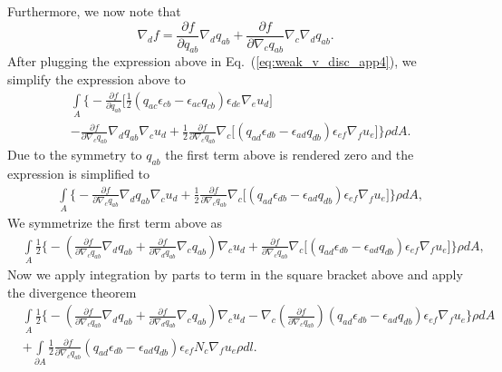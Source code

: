 Furthermore, we now note that 
\begin{equation}
	\nabla_d f = \frac{\partial f}{\partial q_{ab}}\nabla_d q_{ab} + \frac{\partial f}{\partial \nabla_c q_{ab}} \nabla_c \nabla_d q_{ab}.
\end{equation}
After plugging the expression above in Eq.~(\ref{eq:weak_v_disc_app4}), we simplify the expression above to 
\begin{equation}
	\label{eq:weak_v_disc_app5}
	\begin{aligned}
		&\underset{ A}{\int} \bigg \{   - \frac{\partial f}{\partial q_{ab}}  \bigg[\frac{1}{2}\left(q_{ac} \epsilon_{cb}-\epsilon_{ac}q_{cb}\right) \epsilon_{de}\nabla_e u_d\bigg] \\
		&-  \frac{\partial f}{\partial \nabla_c q_{ab}} \nabla_d q_{ab} \nabla_c u_d + \frac{1}{2} \frac{\partial f}{\partial \nabla_c q_{ab}} \nabla_c\bigg[\left(q_{ad} \epsilon_{db}-\epsilon_{ad}q_{db}\right) \epsilon_{ef}\nabla_f u_e\bigg] \bigg \} \rho dA .
	\end{aligned}
\end{equation}
Due to the symmetry to $q_{ab}$ the first term above is rendered zero and the expression is simplified to
\begin{equation}
	\label{eq:weak_v_disc_app6}
	\begin{aligned}
		&\underset{ A}{\int} \bigg \{ -\frac{\partial f}{\partial \nabla_c q_{ab}}  \nabla_d q_{ab} \nabla_c u_d +\frac{1}{2} \frac{\partial f}{\partial \nabla_c q_{ab}} \nabla_c\bigg[\left(q_{ad} \epsilon_{db}-\epsilon_{ad}q_{db}\right) \epsilon_{ef}\nabla_f u_e\bigg] \bigg \} \rho dA ,
	\end{aligned}
\end{equation}
We symmetrize the first term above as
\begin{equation}
	\label{eq:weak_v_disc_app7}
	\begin{aligned}
		&\underset{ A}{\int} \frac{1}{2}\bigg \{  -\left(\frac{\partial f}{\partial \nabla_c q_{ab}}  \nabla_d q_{ab} + \frac{\partial f}{\partial \nabla_d q_{ab}}  \nabla_c q_{ab}  \right)\nabla_c u_d + \frac{\partial f}{\partial \nabla_c q_{ab}} \nabla_c\bigg[\left(q_{ad} \epsilon_{db}-\epsilon_{ad}q_{db}\right) \epsilon_{ef}\nabla_f u_e\bigg] \bigg \} \rho dA ,
	\end{aligned}
\end{equation}
Now we apply integration by parts to term in the square bracket above and apply the divergence theorem
\begin{equation}
	\label{eq:weak_v_disc_app8}
	\begin{aligned}
		&\underset{ A}{\int} \frac{1}{2}\bigg \{  -\left(\frac{\partial f}{\partial \nabla_c q_{ab}}  \nabla_d q_{ab} + \frac{\partial f}{\partial \nabla_d q_{ab}}  \nabla_c q_{ab}  \right)\nabla_c u_d - \nabla_c \left( \frac{\partial f}{\partial \nabla_c q_{ab}}\right)  \left(q_{ad} \epsilon_{db}-\epsilon_{ad}q_{db}\right) \epsilon_{ef}\nabla_f u_e \bigg \} \rho dA   \\
		& + \underset{ \partial A}{\int} \frac{1}{2}\frac{\partial f}{\partial \nabla_c q_{ab}} \left(q_{ad} \epsilon_{db}-\epsilon_{ad}q_{db} \right) \epsilon_{ef} N_c \nabla_f u_e \rho d l .
	\end{aligned}
\end{equation}
